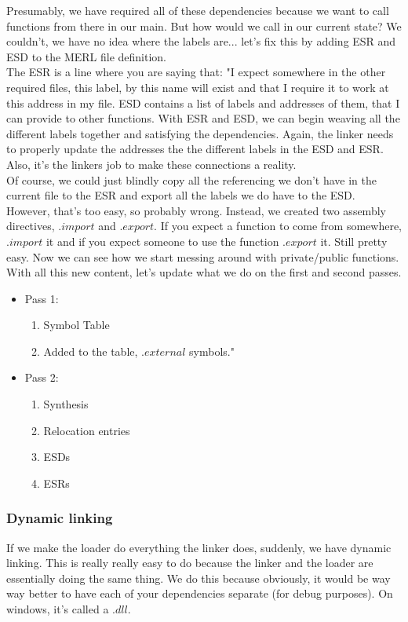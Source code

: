 \documentclass[12pt, twoside]{article}
\begin{document}
Presumably, we have required all of these dependencies because we want to call functions from there in our main.  But how would we call in our current state?  We couldn't, we have no idea where the labels are... let's fix this by adding ESR and ESD to the MERL file definition. \\

The ESR is a line where you are saying that: "I expect somewhere in the other required files, this label, by this name will exist and that I require it to work at this address in my file.  ESD contains a list of labels and addresses of them, that I can provide to other functions. With ESR and ESD, we can begin weaving all the different labels together and satisfying the dependencies.  Again, the linker needs to properly update the addresses the the different labels in the ESD and ESR. Also, it's the linkers job to make these connections a reality.\\

Of course, we could just blindly copy all the referencing we don't have in the current file to the ESR and export all the labels we do have to the ESD.  However, that's too easy, so probably wrong.  Instead, we created two assembly directives, $.import$ and $.export$.  If you expect a function to come from somewhere, $.import$ it and if you expect someone to use the function $.export$ it.  Still pretty easy. Now we can see how we start messing around with private/public functions.  \\

With all this new content, let's update what we do on the first and second passes.
\begin{itemize}
\item Pass 1:
	\begin{enumerate}
	\item Symbol Table
	\item Added to the table, $.external$ symbols."
	\end{enumerate}
\item Pass 2:
	\begin{enumerate}
	\item Synthesis
	\item Relocation entries
	\item ESDs
	\item ESRs
	\end{enumerate} 
\end{itemize}

\subsubsection{Dynamic linking}
If we make the loader do everything the linker does, suddenly, we have dynamic linking.  This is really really easy to do because the linker and the loader are essentially doing the same thing.  We do this because obviously, it would be way way better to have each of your dependencies separate (for debug purposes).  On windows, it's called a $.dll$. \\
\end{document}
